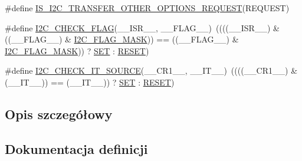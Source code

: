 \begin{DoxyCompactItemize}
\item 
\#define \hyperlink{group___i2_c___i_s___r_t_c___definitions_ga13a3986011ca018dd12ff39ea3bec11b}{I\+S\+\_\+\+I2\+C\+\_\+\+T\+R\+A\+N\+S\+F\+E\+R\+\_\+\+O\+T\+H\+E\+R\+\_\+\+O\+P\+T\+I\+O\+N\+S\+\_\+\+R\+E\+Q\+U\+E\+ST}(R\+E\+Q\+U\+E\+ST)
\item 
\#define \hyperlink{group___i2_c___i_s___r_t_c___definitions_ga31873e0595e29c80cffe00c2d2e073ab}{I2\+C\+\_\+\+C\+H\+E\+C\+K\+\_\+\+F\+L\+AG}(\+\_\+\+\_\+\+I\+S\+R\+\_\+\+\_\+,  \+\_\+\+\_\+\+F\+L\+A\+G\+\_\+\+\_\+)~((((\+\_\+\+\_\+\+I\+S\+R\+\_\+\+\_\+) \& ((\+\_\+\+\_\+\+F\+L\+A\+G\+\_\+\+\_\+) \& \hyperlink{group___i2_c___private___constants_gafbc0a6e4113be03100fbae1314a8b395}{I2\+C\+\_\+\+F\+L\+A\+G\+\_\+\+M\+A\+SK})) == ((\+\_\+\+\_\+\+F\+L\+A\+G\+\_\+\+\_\+) \& \hyperlink{group___i2_c___private___constants_gafbc0a6e4113be03100fbae1314a8b395}{I2\+C\+\_\+\+F\+L\+A\+G\+\_\+\+M\+A\+SK})) ? \hyperlink{group___exported__types_gga89136caac2e14c55151f527ac02daaffab44c8101cc294c074709ec1b14211792}{S\+ET} \+: \hyperlink{group___exported__types_gga89136caac2e14c55151f527ac02daaffa589b7d94a3d91d145720e2fed0eb3a05}{R\+E\+S\+ET})
\item 
\#define \hyperlink{group___i2_c___i_s___r_t_c___definitions_gacc7c83a67d99d759923c6907f1a1751f}{I2\+C\+\_\+\+C\+H\+E\+C\+K\+\_\+\+I\+T\+\_\+\+S\+O\+U\+R\+CE}(\+\_\+\+\_\+\+C\+R1\+\_\+\+\_\+,  \+\_\+\+\_\+\+I\+T\+\_\+\+\_\+)~((((\+\_\+\+\_\+\+C\+R1\+\_\+\+\_\+) \& (\+\_\+\+\_\+\+I\+T\+\_\+\+\_\+)) == (\+\_\+\+\_\+\+I\+T\+\_\+\+\_\+)) ? \hyperlink{group___exported__types_gga89136caac2e14c55151f527ac02daaffab44c8101cc294c074709ec1b14211792}{S\+ET} \+: \hyperlink{group___exported__types_gga89136caac2e14c55151f527ac02daaffa589b7d94a3d91d145720e2fed0eb3a05}{R\+E\+S\+ET})
\end{DoxyCompactItemize}


\subsection{Opis szczegółowy}


\subsection{Dokumentacja definicji}
\mbox{\label{group___i2_c___i_s___r_t_c___definitions_ga31873e0595e29c80cffe00c2d2e073ab}} 
